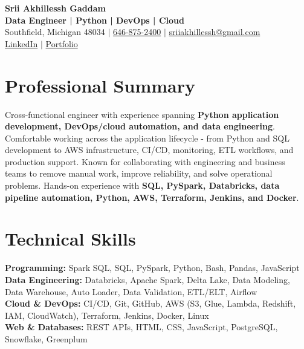 \documentclass[letterpaper,10pt]{article}
\begin{document}
\fontsize{9.35pt}{10.45pt}\selectfont

\begin{center}
    {\LARGE \textbf{Srii Akhillessh Gaddam}} \\[-1pt]
    \textbf{Data Engineer | Python | DevOps | Cloud} \\[2pt]
    Southfield, Michigan 48034 $|$
    \href{tel:6468752400}{646-875-2400} $|$
    \href{mailto:sriiakhillessh@gmail.com}{sriiakhillessh@gmail.com} \\[1pt]
    \href{https://www.linkedin.com/in/srii-akhiilessh-gaddam-b48668191/}{LinkedIn} $|$
    \href{https://sriiakhillesshg.github.io/portfolio/}{Portfolio}
\end{center}
\vspace{-8pt}

\section{Professional Summary}
\small{Cross-functional engineer with experience spanning \textbf{Python application development, DevOps/cloud automation, and data engineering}. Comfortable working across the application lifecycle - from Python and SQL development to AWS infrastructure, CI/CD, monitoring, ETL workflows, and production support. Known for collaborating with engineering and business teams to remove manual work, improve reliability, and solve operational problems. Hands-on experience with \textbf{SQL, PySpark, Databricks, data pipeline automation, Python, AWS, Terraform, Jenkins, and Docker}.}

\section{Technical Skills}
\small{
\textbf{Programming:} Spark SQL, SQL, PySpark, Python, Bash, Pandas, JavaScript \\
\textbf{Data Engineering:} Databricks, Apache Spark, Delta Lake, Data Modeling, Data Warehouse, Auto Loader, Data Validation, ETL/ELT, Airflow \\
\textbf{Cloud \& DevOps:} CI/CD, Git, GitHub, AWS (S3, Glue, Lambda, Redshift, IAM, CloudWatch), Terraform, Jenkins, Docker, Linux \\
\textbf{Web \& Databases:} REST APIs, HTML, CSS, JavaScript, PostgreSQL, Snowflake, Greenplum
}
\end{document}
